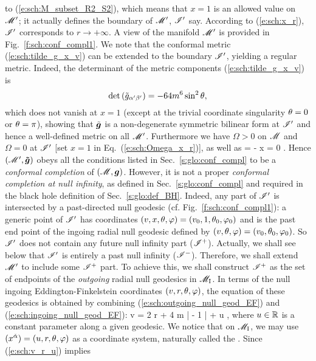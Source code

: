 to (\ref{e:sch:M_subset_R2_S2}), which means
that $x=1$ is an allowed value on $\mathscr{M}'$; it actually defines the boundary of
$\mathscr{M}'$, $\mathscr{I}'$ say.
According to (\ref{e:sch:x_r}),
$\mathscr{I}'$ corresponds to $r\rightarrow +\infty$.
A view of the manifold $\mathscr{M}'$ is
provided in Fig.~\ref{f:sch:conf_compl1}.
We note that the conformal metric (\ref{e:sch:tilde_g_x_v}) can be extended
to the boundary $\mathscr{I}'$, yielding a regular metric. Indeed, the determinant of
the metric components (\ref{e:sch:tilde_g_x_v}) is
\[
    \det\left({\tilde{g}}_{\alpha'\beta'}\right) = - 64 m^6 \sin^2\theta ,
\]
which does not vanish at $x=1$ (except at the trivial coordinate singularity
$\theta=0$ or $\theta=\pi$), showing that $\tilde{\bm{g}}$ is a non-degenerate
symmetric bilinear form at $\mathscr{I}'$ and hence a well-defined metric on all
$\mathscr{M}'$.
Furthermore
we have $\Omega >0$ on $\mathscr{M}$ and $\Omega=0$ at $\mathscr{I}'$ [set $x=1$ in Eq.~(\ref{e:sch:Omega_x_r})], as well as
\be
    \dd \Omega = - \dd x \not = 0 .
\ee
Hence $(\mathscr{M}',\bm{\tilde{g}})$ obeys all the conditions
listed in Sec.~\ref{s:glo:conf_compl} to be a \emph{conformal completion}
of $(\mathscr{M},\bm{g})$.
However, it is not a proper \emph{conformal completion at null infinity},
as defined in Sec.~\ref{s:glo:conf_compl} and required in the black hole
definition of Sec.~\ref{s:glo:def_BH}. Indeed, any part of $\mathscr{I}'$ is intersected by
a past-directed null geodesic (cf. Fig.~\ref{f:sch:conf_compl1}): a generic point of $\mathscr{I}'$ has coordinates
$(v,x,\theta,\varphi) = (v_0,1,\theta_0,\varphi_0)$ and is the past end point of the
ingoing radial null geodesic defined by
$(v,\theta,\varphi) = (v_0,\theta_0,\varphi_0)$.
So $\mathscr{I}'$ does not contain any future null infinity part ($\mathscr{I}^+$). Actually,
we shall see below that $\mathscr{I}'$ is entirely a past null infinity ($\mathscr{I}^-$).
Therefore, we shall extend $\mathscr{M}'$ to include some $\mathscr{I}^+$ part.
To achieve this, we shall construct $\mathscr{I}^+$ as the set of endpoints of the
\emph{outgoing} radial null geodesics in $\mathscr{M}_{\rm I}$. In terms of
the null ingoing Eddington-Finkelstein coordinates $(v,r,\theta,\varphi)$,
the equation of these geodesics is obtained by combining (\ref{e:sch:outgoing_null_geod_EF}) and (\ref{e:sch:ingoing_null_geod_EF}):
\be \label{e:sch:v_r_u}
    v = 2 r + 4 m \ln \left|  - 1 \right| + u ,
\ee
where $u\in\mathbb{R}$ is a constant parameter along a given geodesic.
We notice that on $\mathscr{M}_{\rm I}$, we may use $(x^{\check{\alpha}}) = (u,r,\theta,\varphi)$ as a coordinate
system, naturally called the . Since (\ref{e:sch:v_r_u}) implies
